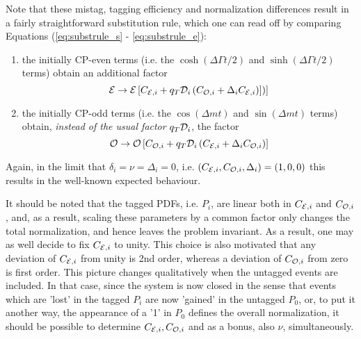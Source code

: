 \documentclass[a4paper,9pt,twosided]{article}
\begin{document}
Note that these mistag, tagging efficiency and normalization differences result in a fairly 
straightforward substitution rule, which one can read off by comparing Equations (\ref{eq:substrule_s} - \ref{eq:substrule_e}):
\begin{enumerate}
\item
the initially CP-even terms (i.e. the $\cosh(\Delta\Gamma t/2)$ and $\sinh(\Delta\Gamma t/2)$ terms) obtain an additional
factor 
\begin{equation}
   {\cal E} \rightarrow {\cal E} \left[ C_{{\cal E},i} + q_T {\cal D}_i \left( C_{{\cal O},i}+{\Delta}_i C_{{\cal E},i}) ]\right) \right]
\end{equation}
\item
the initially CP-odd terms (i.e. the $\cos(\Delta m t) $ and $\sin(\Delta m t)$ terms) obtain, { \em instead of the
usual factor} $q_T{\cal D}_i$, the factor
\begin{equation}
   {\cal O} \rightarrow {\cal O} \left[ C_{{\cal O},i} +  q_T {\cal D}_i  \left( C_{{\cal E},i} + {\Delta}_iC_{{\cal O},i} \right) \right]
\end{equation}
\end{enumerate}
Again, in the limit that $\delta_i=\nu={\Delta}_i=0$, i.e. $(C_{{\cal E},i},C_{{\cal O},i},\Delta_i) = (1,0,0)$ this results in the well-known expected behaviour.

It should be noted that the tagged PDFs, i.e. $P_i$, are linear both in $C_{{\cal E},i}$ and $C_{{\cal O},i}$,
and, as a result, scaling these parameters by a common 
factor only changes the total normalization, and hence leaves the problem invariant. As a result, one
may as well decide to fix $C_{{\cal E},i}$ to unity. This choice is also motivated that any deviation of $C_{{\cal E},i}$ from
unity is 2nd order, whereas a deviation of $C_{{\cal O},i}$ from zero is first order. 
This picture changes qualitatively when the untagged events are included. In that case, since
the system is now closed in the sense that events which are 'lost' in the tagged $P_i$ are now 
'gained' in the untagged $P_0$, or, to put it another way, the appearance of a '1' in $P_0$ defines
the overall normalization, it should be possible to determine $C_{{\cal E},i}, C_{{\cal O},i}$ and
as a bonus, also $\nu$, simultaneously.
\end{document}
